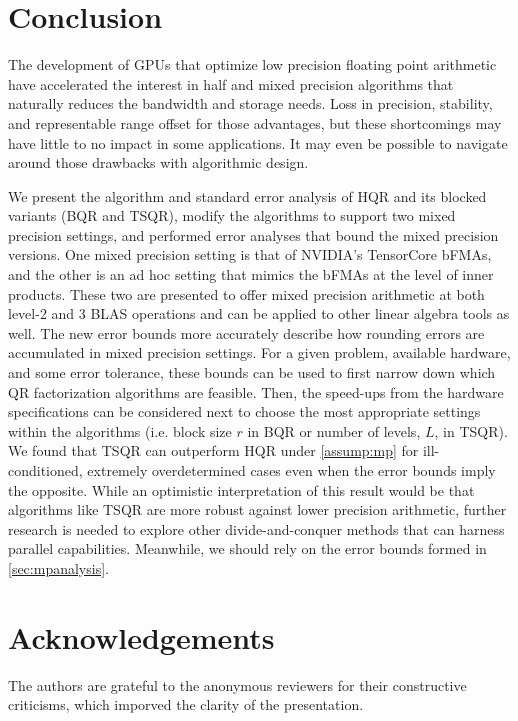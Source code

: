 \documentclass[review,onefignum,onetabnum]{siamart190516}
\begin{document}
\section{Conclusion}
The development of GPUs that optimize low precision floating point arithmetic have accelerated the interest in half and mixed precision algorithms that naturally reduces the bandwidth and storage needs. 
Loss in precision, stability, and representable range offset for those advantages, but these shortcomings may have little to no impact in some applications.
It may even be possible to navigate around those drawbacks with algorithmic design. \par
We present the algorithm and standard error analysis of HQR and its blocked variants (BQR and TSQR), modify the algorithms to support two mixed precision settings, and performed error analyses that bound the mixed precision versions.
One mixed precision setting is that of NVIDIA's TensorCore bFMAs, and the other is an ad hoc setting that mimics the bFMAs at the level of inner products.
These two are presented to offer mixed precision arithmetic at both level-2 and 3 BLAS operations and can be applied to other linear algebra tools as well.
The new error bounds more accurately describe how rounding errors are accumulated in mixed precision settings.
For a given problem, available hardware, and some error tolerance, these bounds can be used to first narrow down which QR factorization algorithms are feasible. 
Then, the speed-ups from the hardware specifications can be considered next to choose the most appropriate settings within the algorithms (i.e. block size $r$ in BQR or number of levels, $L$, in TSQR).
We found that TSQR can outperform HQR under \cref{assump:mp} for ill-conditioned, extremely overdetermined cases even when the error bounds imply the opposite.
While an optimistic interpretation of this result would be that algorithms like TSQR are more robust against lower precision arithmetic, further research is needed to explore other divide-and-conquer methods that can harness parallel capabilities.
Meanwhile, we should rely on the error bounds formed in \cref{sec:mpanalysis}.
\section*{Acknowledgements}
The authors are grateful to the anonymous reviewers for their constructive criticisms, which imporved the clarity of the presentation.

\end{document}
